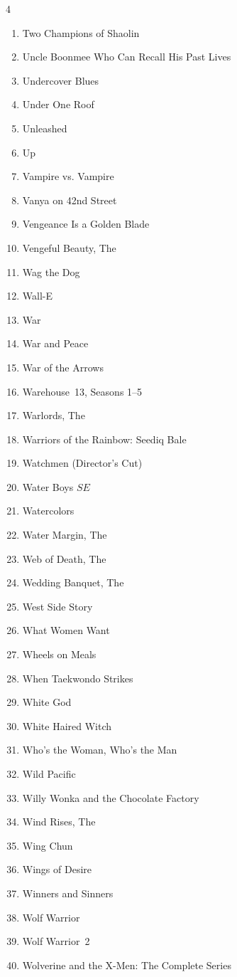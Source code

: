 \documentclass{article}
\newcommand\SE{\(SE\)}
\begin{document}
\begin{multicols}{4}
\begin{enumerate}
\item Two Champions of Shaolin
\item Uncle Boonmee Who Can Recall His Past Lives
\item Undercover Blues
\item Under One Roof
\item Unleashed
\item Up
\item Vampire vs. Vampire
\item Vanya on 42nd Street
\item Vengeance Is a Golden Blade
\item Vengeful Beauty, The
\item Wag the Dog
\item Wall-E
\item War
\item War and Peace
\item War of the Arrows
\item Warehouse~13, Seasons 1--5
\item Warlords, The
\item Warriors of the Rainbow: Seediq Bale
\item Watchmen (Director's Cut)
\item Water Boys \SE
\item Watercolors
\item Water Margin, The
\item Web of Death, The
\item Wedding Banquet, The
\item West Side Story
\item What Women Want
\item Wheels on Meals
\item When Taekwondo Strikes
\item White God
\item White Haired Witch
\item Who's the Woman, Who's the Man
\item Wild Pacific
\item Willy Wonka and the Chocolate Factory
\item Wind Rises, The
\item Wing Chun
\item Wings of Desire
\item Winners and Sinners
\item Wolf Warrior
\item Wolf Warrior~2
\item Wolverine and the X-Men: The Complete Series

\end{enumerate}
\end{multicols}
\end{document}
